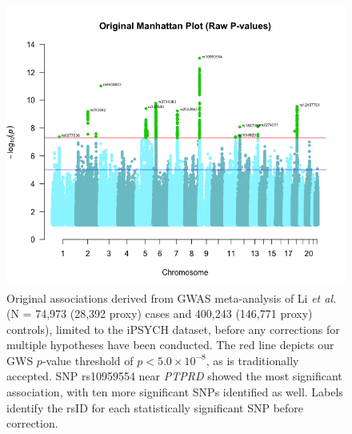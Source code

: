 \documentclass[12pt]{article}
\begin{document}

\begin{figure}
    \centering
    \includegraphics[width=1\linewidth]{Thesis_OriginalManhattanPlot.png}
  \caption{Original associations derived from GWAS meta-analysis of Li \textit{et al.} (N = 74,973 (28,392 proxy) cases and 400,243 (146,771 proxy) controls), limited to the iPSYCH dataset, before any corrections for multiple hypotheses have been conducted. The red line depicts our GWS $p$-value threshold of $p < 5.0 \times 10^{-8}$, as is traditionally accepted. SNP rs10959554 near \textit{PTPRD} showed the most significant association, with ten more significant SNPs identified as well. Labels identify the rsID for each statistically significant SNP before correction.}

    \label{fig:enter-label}
\end{figure}
\clearpage
\end{document}
